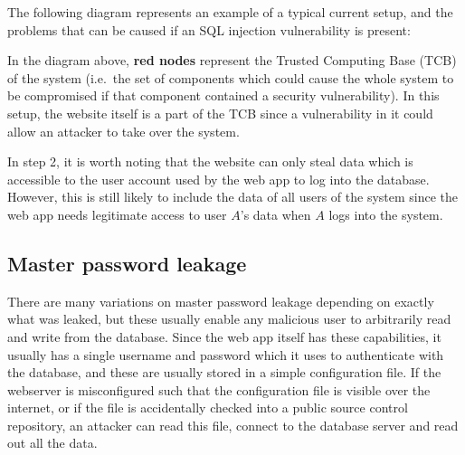 \documentclass[12pt]{report}
\begin{document}
The following diagram represents an example of a typical current setup, and the problems that can be caused if an SQL injection vulnerability is present:

\begin{center}
\end{center}

In the diagram above, \textbf{red nodes} represent the Trusted Computing Base (TCB) of the system (i.e.\ the set of components which could cause the whole system to be compromised if that component contained a security vulnerability). In this setup, the website itself is a part of the TCB since a vulnerability in it could allow an attacker to take over the system.

In step 2, it is worth noting that the website can only steal data which is accessible to the user account used by the web app to log into the database. However, this is still likely to include the data of all users of the system since the web app needs legitimate access to user $A$'s data when $A$ logs into the system.

\subsection{Master password leakage}
There are many variations on master password leakage depending on exactly what was leaked, but these usually enable any malicious user to arbitrarily read and write from the database. Since the web app itself has these capabilities, it usually has a single username and password which it uses to authenticate with the database, and these are usually stored in a simple configuration file. If the webserver is misconfigured such that the configuration file is visible over the internet, or if the file is accidentally checked into a public source control repository, an attacker can read this file, connect to the database server and read out all the data.
\end{document}
